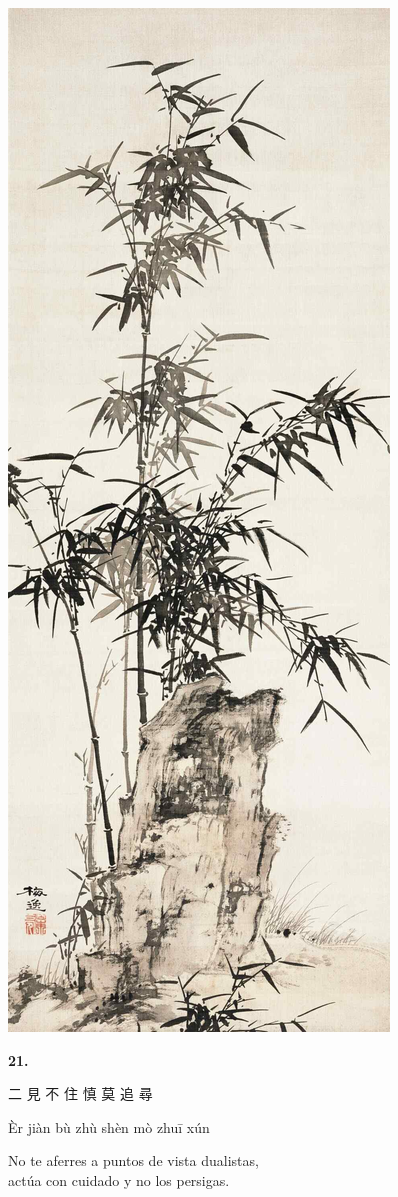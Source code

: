 \documentclass[
  a5paperpaper,
]{article}
\begin{document}
\hypertarget{01}{}
\includegraphics{../img/image05.jpg}

\begin{verseblock}

\newpage

\begin{center}\textbf{21.}\end{center}

二 見 不 住 慎 莫 追 尋

Èr jiàn bù zhù shèn mò zhuī xún

No te aferres a puntos de vista dualistas,\\
actúa con cuidado y no los persigas.

\end{verseblock}
\end{document}
